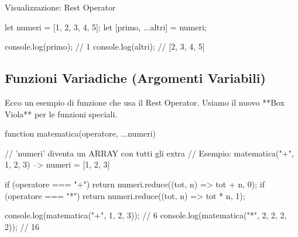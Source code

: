 \begin{concept}{Visualizzazione: Rest Operator}
\begin{center}
\end{center}
\end{concept}

\begin{jsbox}
let numeri = [1, 2, 3, 4, 5];
let [primo, ...altri] = numeri;

console.log(primo); // 1
console.log(altri); // [2, 3, 4, 5]
\end{jsbox}

\subsection{Funzioni Variadiche (Argomenti Variabili)}
Ecco un esempio di funzione che usa il Rest Operator. Usiamo il nuovo **Box Viola** per le funzioni speciali.

\begin{funcbox}[title=Funzione Math Universale]
function matematica(operatore, ...numeri) {
    // 'numeri' diventa un ARRAY con tutti gli extra
    // Esempio: matematica("+", 1, 2, 3) --> numeri = [1, 2, 3]
    
    if (operatore === "+") {
        return numeri.reduce((tot, n) => tot + n, 0);
    }
    if (operatore === "*") {
        return numeri.reduce((tot, n) => tot * n, 1);
    }
}
\end{funcbox}

\begin{jsbox}
console.log(matematica("+", 1, 2, 3)); // 6
console.log(matematica("*", 2, 2, 2, 2)); // 16
\end{jsbox}

